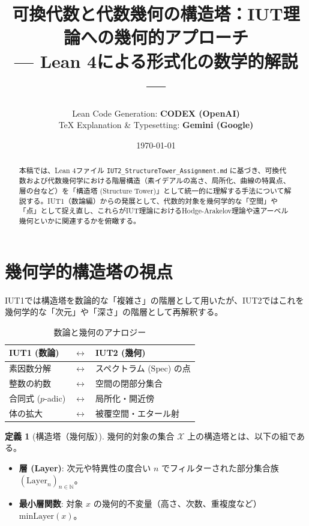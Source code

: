 \documentclass[a4paper,11pt]{ltjsarticle}
\title{\textbf{可換代数と代数幾何の構造塔：IUT理論への幾何的アプローチ} \\ \large --- Lean 4による形式化の数学的解説 ---}
\author{
    Lean Code Generation: \textbf{CODEX (OpenAI)} \\
    TeX Explanation \& Typesetting: \textbf{Gemini (Google)}
}
\date{\today}
\theoremstyle{definition}
\newtheorem{definition}{定義}[section]
\newcommand{\N}{\mathbb{N}}
\newcommand{\Spec}{\mathrm{Spec}}
\newcommand{\Carrier}{\mathcal{X}}
\newcommand{\Layer}[1]{\mathrm{Layer}_{#1}}
\newcommand{\MinLayer}{\mathrm{minLayer}}
\begin{document}
\maketitle

\begin{abstract}
本稿では、Lean 4ファイル \texttt{IUT2\_StructureTower\_Assignment.md} に基づき、可換代数および代数幾何学における階層構造（素イデアルの高さ、局所化、曲線の特異点、層の台など）を「構造塔 (Structure Tower)」として統一的に理解する手法について解説する。IUT1（数論編）からの発展として、代数的対象を幾何学的な「空間」や「点」として捉え直し、これらがIUT理論におけるHodge-Arakelov理論や遠アーベル幾何といかに関連するかを俯瞰する。
\end{abstract}

\tableofcontents
\newpage

\section{幾何学的構造塔の視点}

IUT1では構造塔を数論的な「複雑さ」の階層として用いたが、IUT2ではこれを幾何学的な「次元」や「深さ」の階層として再解釈する。

\begin{table}[h]
\centering
\caption{数論と幾何のアナロジー}
\begin{tabular}{lcl}
\toprule
\textbf{IUT1 (数論)} & $\longleftrightarrow$ & \textbf{IUT2 (幾何)} \\ \midrule
素因数分解 & $\longleftrightarrow$ & スペクトラム ($\Spec$) の点 \\
整数の約数 & $\longleftrightarrow$ & 空間の閉部分集合 \\
合同式 ($p$-adic) & $\longleftrightarrow$ & 局所化・開近傍 \\
体の拡大 & $\longleftrightarrow$ & 被覆空間・エタール射 \\
\bottomrule
\end{tabular}
\end{table}

\begin{definition}[構造塔（幾何版）]
幾何的対象の集合 $\Carrier$ 上の構造塔とは、以下の組である。
\begin{itemize}
    \item \textbf{層 (Layer)}: 次元や特異性の度合い $n$ でフィルターされた部分集合族 $(\Layer{n})_{n \in \N}$。
    \item \textbf{最小層関数}: 対象 $x$ の幾何的不変量（高さ、次数、重複度など） $\MinLayer(x)$。
\end{itemize}
\end{definition}
\end{document}
